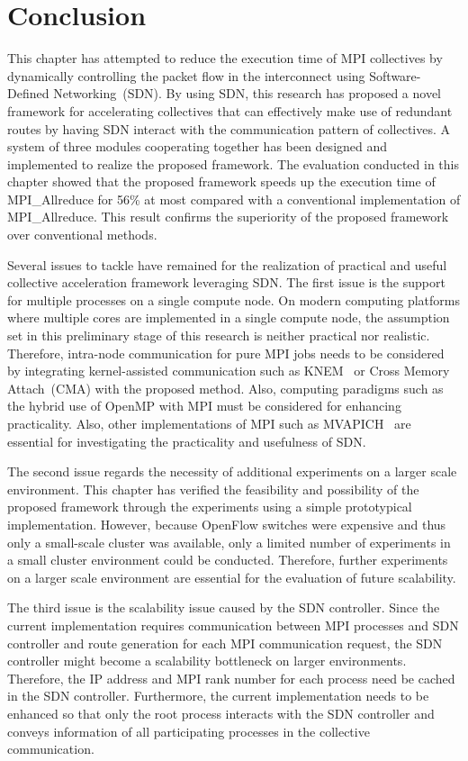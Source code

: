 \section{Conclusion}\label{sec:iii-conclusion}

This chapter has attempted to reduce the execution time of MPI
collectives by dynamically controlling the packet flow in the interconnect
using Software-Defined Networking~(SDN).
By using SDN, this research  has proposed a novel framework for accelerating
collectives that can effectively make use of redundant routes by having SDN
interact with the communication pattern of collectives. A system of three
modules cooperating together has been designed and implemented to realize the
proposed framework. The evaluation conducted in this chapter showed that the
proposed framework speeds up the execution time of MPI\_Allreduce for 56\% at
most compared with a conventional implementation of MPI\_Allreduce. This
result confirms the superiority of the proposed framework over conventional
methods.

Several issues to tackle have remained for the realization of practical
and useful collective acceleration framework leveraging SDN\@.
The first issue is the support for multiple processes on a single compute
node. On modern computing platforms where multiple cores are implemented in a
single compute node, the assumption set in this preliminary stage of this
research is neither practical nor realistic. Therefore, intra-node
communication for pure MPI jobs needs to be considered by integrating
kernel-assisted communication such as KNEM~\autocite{Goglin2013} or Cross
Memory Attach~(CMA) with the proposed method. Also, computing paradigms such
as the hybrid use of OpenMP with MPI must be considered for enhancing
practicality. Also, other implementations of MPI such as
MVAPICH~\autocite{mvapich} are essential for investigating the practicality
and usefulness of SDN\@.

The second issue regards the necessity of additional experiments on a
larger scale environment. This chapter has verified the feasibility and
possibility of the proposed framework through the experiments using a simple
prototypical implementation. However, because OpenFlow switches were expensive
and thus only a small-scale cluster was available, only a limited number of
experiments in a small cluster environment could be conducted. Therefore,
further experiments on a larger scale environment are essential for the
evaluation of future scalability.

The third issue is the scalability issue caused by the SDN controller.
Since the current implementation requires communication between MPI processes
and SDN controller and route generation for each MPI communication request,
the SDN controller might become a scalability bottleneck on larger
environments. Therefore, the IP address and MPI rank number for each process
need be cached in the SDN controller. Furthermore, the current implementation
needs to be enhanced so that only the root process interacts with the SDN
controller and conveys information of all participating processes in the
collective communication.
